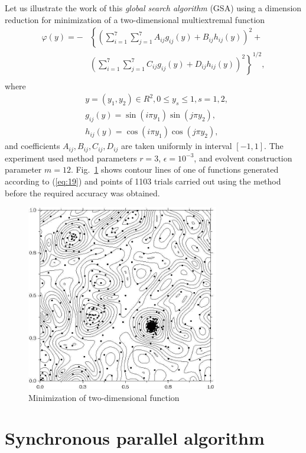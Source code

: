 \documentclass[smallcondensed]{svjour3}     %
\begin{document}
Let us illustrate the work of this \textit{global search algorithm} (GSA) using a dimension reduction for minimization of a two-dimensional multiextremal function
\begin{eqnarray} \nonumber \label{eq:19}
\varphi(y)= -&\left\{\left(\sum^{7}_{i=1}\sum^{7}_{j=1}A_{ij}g_{ij}(y)+B_{ij}h_{ij}(y)\right)^2+\right. \\
&\left.\left(\sum^{7}_{i=1}\sum^{7}_{j=1}C_{ij}g_{ij}(y)+D_{ij}h_{ij}(y)\right)^2\right\}^{1/2},\\ \nonumber
\end{eqnarray}
where
\begin{eqnarray} \nonumber
& y=(y_1,y_2)\in R^2, 0 \leq y_s \leq 1, s=1,2, \\ \nonumber
& g_{ij}(y)=\sin(i\pi y_1)\sin(j\pi y_2),  \\ \nonumber
& h_{ij}(y)=\cos(i\pi y_1)\cos(j\pi y_2), \nonumber 
\end{eqnarray}
and coefficients $A_{ij}, B_{ij}, C_{ij}, D_{ij}$  are taken uniformly in interval $[-1,1]$. The experiment used method parameters $r=3$, $\epsilon=10^{-3}$, and evolvent construction parameter $m=12$. Fig.~\ref{fig:1} shows contour lines of one of functions generated according to (\ref{eq:19}) and points of 1103 trials carried out using the method before the required accuracy was obtained.
\begin{figure}
	\center
  \includegraphics[width=0.75\textwidth]{fig1.jpg} 
  \caption{Minimization of two-dimensional function}
  \label{fig:1}       %
\end{figure}

\section{Synchronous parallel algorithm} \label{sec:3}
\end{document}
